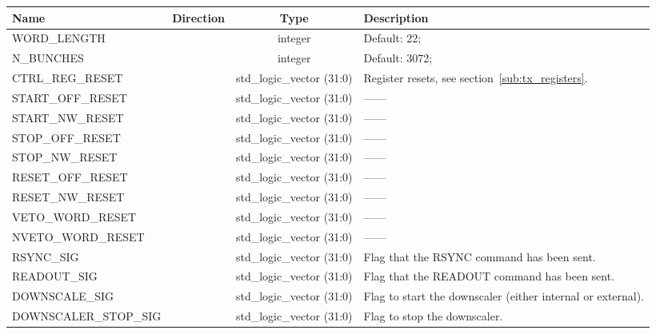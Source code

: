 \documentclass[]{article}
\newcommand*{\dittostraight}{---\textquotedbl---} %
\begin{document}
  \begin{table}
    \begin{center}
    \begin{tabulary}{\textwidth}{l | c | c | L}
      Name & Direction & Type & Description \\
      \hline
      WORD\_LENGTH          & & integer                   &  Default: 22;                                         \\
      N\_BUNCHES            & & integer                   &  Default: 3072;                                       \\
      CTRL\_REG\_RESET      & & std\_logic\_vector (31:0) &  Register resets, see section~\ref{sub:tx_registers}. \\
      START\_OFF\_RESET     & & std\_logic\_vector (31:0) &  \dittostraight                                       \\ 
      START\_NW\_RESET      & & std\_logic\_vector (31:0) &  \dittostraight                                       \\ 
      STOP\_OFF\_RESET      & & std\_logic\_vector (31:0) &  \dittostraight                                       \\ 
      STOP\_NW\_RESET       & & std\_logic\_vector (31:0) &  \dittostraight                                       \\ 
      RESET\_OFF\_RESET     & & std\_logic\_vector (31:0) &  \dittostraight                                       \\ 
      RESET\_NW\_RESET      & & std\_logic\_vector (31:0) &  \dittostraight                                       \\ 
      VETO\_WORD\_RESET     & & std\_logic\_vector (31:0) &  \dittostraight                                       \\ 
      NVETO\_WORD\_RESET    & & std\_logic\_vector (31:0) &  \dittostraight                                       \\ 
      RSYNC\_SIG            & & std\_logic\_vector (31:0) & Flag that the RSYNC command has been sent.                 \\
      READOUT\_SIG          & & std\_logic\_vector (31:0) & Flag that the READOUT command has been sent.               \\
      DOWNSCALE\_SIG        & & std\_logic\_vector (31:0) & Flag to start the downscaler (either internal or external).\\
      DOWNSCALER\_STOP\_SIG & & std\_logic\_vector (31:0) & Flag to stop the downscaler.                               \\

\end{tabulary}
\end{center}
\end{table}
\end{document}
